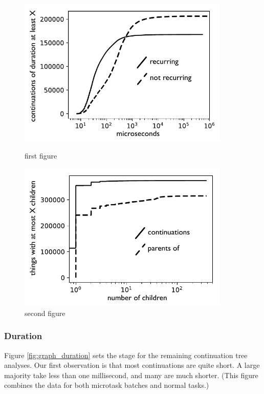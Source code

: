 \documentclass[acmsmall,anonymous,review]{acmart}\settopmatter{printfolios=true,printccs=false,printacmref=false}
\begin{document}
\begin{figure}
    \centering
    \begin{minipage}{0.45\textwidth}
        \centering
        \includegraphics[width=0.9\textwidth]{duration_graph_bw}
        \caption{first figure}
    \end{minipage}\hfill
    \begin{minipage}{0.45\textwidth}
        \centering
        \includegraphics[width=0.9\textwidth]{children_graph_bw}
        \caption{second figure}
    \end{minipage}
\end{figure}

\subsubsection{Duration}

Figure \ref{fig:graph_duration} sets the stage for the remaining continuation tree analyses.
Our first observation is that most continuations are quite short.
A large majority take less than one millisecond, and many are much shorter.
(This figure combines the data for both microtask batches and normal tasks.)
\end{document}
